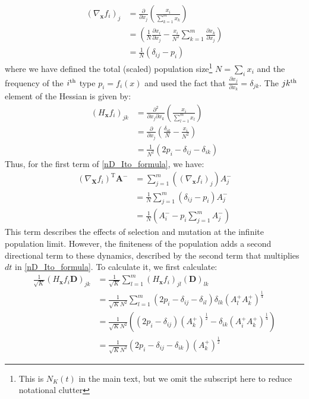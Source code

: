 \begin{align}
\left(\nabla_{\mathbf{x}} f_i\right)_j &= \frac{\partial }{\partial x_j}\left(\frac{x_i}{\sum\limits_{k=1}^{m}x_k}\right)\nonumber\\
&= \left(\frac{1}{N}\frac{\partial x_i}{\partial x_j} 
- \frac{x_i}{N^2}\sum\limits_{k=1}^{m}\frac{\partial x_k}{\partial x_j}\right)\nonumber\\
&= \frac{1}{N}\left(\delta_{ij}-p_i\right)\label{nD_jacobian_for_ito}
\end{align}
where we have defined the total (scaled) population size\footnote{This is $N_{K}(t)$ in the main text, but we omit the subscript here to reduce notational clutter} $N = \sum_i x_i$ and the frequency of the $i\textsuperscript{th}$ type $p_i = f_i(x)$ and used the fact that $\frac{\partial x_j}{\partial x_k} = \delta_{jk}$.
The $jk\textsuperscript{th}$ element of the Hessian is given by:
\begin{align}
\left(H_{\mathbf{x}} f_i\right)_{jk} &= \frac{\partial^2 }{\partial x_j \partial x_k}\left( \frac{x_i}{\sum\limits_{l=1}^{m}x_l}\right)\nonumber\\
&= \frac{\partial}{\partial x_j}\left(\frac{\delta_{ik}}{N}-\frac{x_i}{N^2}\right)\nonumber\\
&= \frac{1}{N^2}\left(2p_i - \delta_{ij}-\delta_{ik}\right)\label{nD_hessian_for_ito}
\end{align}
Thus, for the first term of \eqref{nD_Ito_formula}, we have:
\begin{align}
\left(\nabla_{\mathbf{X}}f_i\right)^{\mathrm{T}}\boldsymbol{\mathbf{A}^{-}} &= \sum\limits_{j=1}^{m}\left(\left(\nabla_{\mathbf{x}} f_i\right)_j\right)A^{-}_{j} \nonumber\\
&= \frac{1}{N}\sum\limits_{j=1}^{m}\left(\delta_{ij}-p_i\right)A^{-}_{j}\nonumber\\
&= \frac{1}{N}\left(A^{-}_{i} - p_i\sum\limits_{j=1}^{m}A^{-}_{j}\right)\label{nD_for_Ito_first_term}
\end{align}
This term describes the effects of selection and mutation at the infinite population limit. However, the finiteness of the population adds a second directional term to these dynamics, described by the second term that multiplies $dt$ in \eqref{nD_Ito_formula}. To calculate it, we first calculate:
\begin{align}
\frac{1}{\sqrt{K}}\left(H_{\mathbf{x}} f_i \mathbf{D}\right)_{jk} &= \frac{1}{\sqrt{K}}\sum\limits_{l=1}^{m} \left(H_{\mathbf{x}} f_i \right)_{jl}\left(\mathbf{D}\right)_{lk}\nonumber\\
&= \frac{1}{\sqrt{K}N^2}\sum\limits_{l=1}^{m}\left(2p_i - \delta_{ij} - \delta_{il}\right)\delta_{lk}\left(A^{+}_{l}A^{+}_{k}\right)^{\frac{1}{4}}\\
&=  \frac{1}{\sqrt{K}N^2}\left(\left(2p_i -\delta_{ij}\right)(A^{+}_{k})^{\frac{1}{2}} -\delta_{ik}\left(A^{+}_{i}A^{+}_{k}\right)^{\frac{1}{4}}\right)\\
&= \frac{1}{\sqrt{K}N^2}\left(2p_i -\delta_{ij} -\delta_{ik}\right)(A^{+}_{k})^{\frac{1}{2}}
\end{align}
